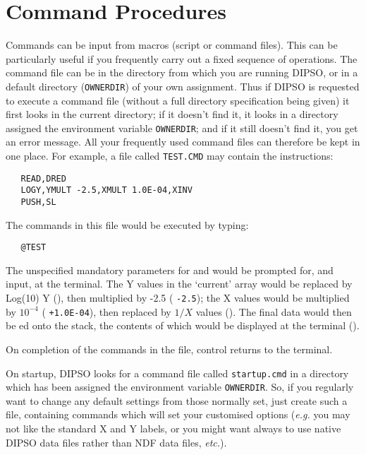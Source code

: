 \section {Command Procedures}

Commands can be input from macros (script or command files). This can
be particularly useful if you frequently carry out a fixed sequence of
operations. The command file can be in the directory from which you
are running DIPSO, or in a default directory ({\tt{OWNERDIR}})  of your own
assignment. Thus if DIPSO is requested to execute a command file
(without a full directory specification being given) it first looks in
the current directory; if it doesn't find it, it looks in a directory
assigned the environment variable {\tt{OWNERDIR}};  and if it
still doesn't find it, you get an error message. All your frequently
used command files can therefore be kept in one place. For example, a
file called {\tt{TEST.CMD}}  may contain the instructions:

\begin{verbatim}
   READ,DRED
   LOGY,YMULT -2.5,XMULT 1.0E-04,XINV
   PUSH,SL
\end{verbatim}

The commands in this file would be executed by typing:

\begin{verbatim}
   @TEST
\end{verbatim}

The unspecified mandatory parameters for  
and   would be prompted for, and input, at
the terminal. The Y values in the `current' array would be replaced by
Log(10) Y (),  then multiplied by -2.5
(  {\tt{-2.5}});  the X values would be multiplied
by $10^{-4}$ (  {\tt{+1.0E-04}}),  then replaced
by $1/X$ values ().  The final data
would then be ed  onto the stack, the
contents of which would be displayed at the terminal ().

On completion of the commands in the file, control returns to the terminal.

On startup, DIPSO looks for a command file called {\tt{startup.cmd}} 
in a directory which has been
assigned the environment variable {\tt{OWNERDIR}}.  So, if
you regularly want to change any default settings from those normally
set, just create such a file, containing commands which will set your
customised options ({\em e.g.} you may not like the standard X and Y
labels, or you might want always to use native DIPSO data files rather
than NDF data files, {\em etc.}).

